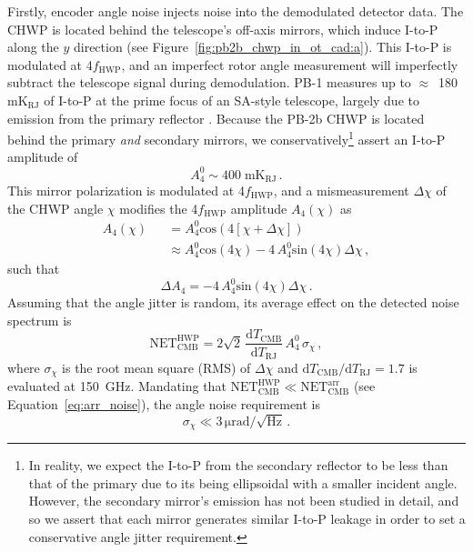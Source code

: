 Firstly, encoder angle noise injects noise into the demodulated detector data. The CHWP is located behind the telescope's off-axis mirrors, which induce I-to-P along the $y$ direction (see Figure~\ref{fig:pb2b_chwp_in_ot_cad:a}). This I-to-P is modulated at 4$f_{\mathrm{HWP}}$, and an imperfect rotor angle measurement will imperfectly subtract the telescope signal during demodulation. PB-1 measures up to $\approx$~180~$\mathrm{mK_{\mathrm{RJ}}}$ of I-to-P at the prime focus of an SA-style telescope, largely due to emission from the primary reflector \cite{takakura_performance_2017}. Because the PB-2b CHWP is located behind the primary \textit{and} secondary mirrors, we conservatively\footnote{In reality, we expect the I-to-P from the secondary reflector to be less than that of the primary due to its being ellipsoidal with a smaller incident angle. However, the secondary mirror's emission has not been studied in detail, and so we assert that each mirror generates similar I-to-P leakage in order to set a conservative angle jitter requirement.} assert an I-to-P amplitude of
\begin{equation}
    A_{4}^{0} \sim 400 \; \mathrm{mK_{\mathrm{RJ}}} \, .
    \label{eq:4f_amp}
\end{equation}
\noindent
This mirror polarization is modulated at 4$f_{\mathrm{HWP}}$, and a mismeasurement $\Delta \chi$ of the CHWP angle $\chi$ modifies the 4$f_{\mathrm{HWP}}$ amplitude $A_{4}(\chi)$ as
\begin{eqnarray}
    A_{4}(\chi) &&= A_{4}^{0} \mathrm{cos}(4 \left[ \chi + \Delta \chi \right] ) \nonumber \\ &&\approx A_{4}^{0} \mathrm{cos}(4 \chi) - 4 \, A_{4}^{0} \mathrm{sin}(4 \chi) \Delta \chi \, ,
    \label{eq:freq_mod}
\end{eqnarray}
\noindent
such that
\begin{equation}
    \Delta A_{4} = -4 \, A_{4}^{0} \mathrm{sin}(4 \chi) \Delta \chi \, .
    \label{eq:delta_chi}
\end{equation}
Assuming that the angle jitter is random, its average effect on the detected noise spectrum is
\begin{equation}
    \mathrm{NET_{CMB}^{HWP}} = 2 \sqrt{2} \,  \frac{\mathrm{d} T_{\mathrm{CMB}}}{\mathrm{d} T_{\mathrm{RJ}}} \, A_{4}^{0} \, \sigma_{\chi} \, ,
    \label{eq:encoder_noise}
\end{equation}
\noindent
where $\sigma_{\chi}$ is the root mean square (RMS) of $\Delta \chi$ and $\mathrm{d} T_{\mathrm{CMB}} / \mathrm{d} T_{\mathrm{RJ}} = 1.7$ is evaluated at 150~GHz. Mandating that $\mathrm{NET_{CMB}^{HWP}} \ll \mathrm{NET_{CMB}^{arr}}$ (see Equation~\ref{eq:arr_noise}), the angle noise requirement is
\begin{equation}
    \sigma_{\chi} \ll 3 \, \mathrm{\mu rad / \sqrt{Hz}} \, .
\end{equation}

